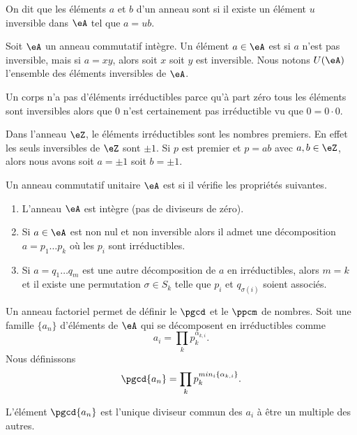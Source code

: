 \begin{definition}  \label{DefrXUixs}
    On dit que les éléments \( a\) et \( b\) d'un anneau sont  si il existe un élément \( u\) inversible dans \( \eA\) tel que \( a=ub\).
\end{definition}

\begin{definition}  \label{DeirredBDhQfA}
    Soit \( \eA\) un anneau commutatif intègre. Un élément \( a\in\eA\) est  si \( a\) n'est pas inversible, mais si \( a=xy\), alors soit \( x\) soit \( y\) est inversible. Nous notons \( U(\eA)\) l'ensemble des éléments inversibles de \( \eA\).
\end{definition}

\begin{remark}
    Un corps n'a pas d'éléments irréductibles parce qu'à part zéro tous les éléments sont inversibles alors que \( 0\) n'est certainement pas irréductible vu que \( 0=0\cdot 0\).
\end{remark}

\begin{example}
    Dans l'anneau \( \eZ\), le éléments irréductibles sont les nombres premiers. En effet les seuls inversibles de \( \eZ\) sont \( \pm 1\). Si \( p\) est premier et \( p=ab\) avec \( a,b\in \eZ\), alors nous avons soit \( a=\pm 1\) soit \( b=\pm 1\).
\end{example}

\begin{definition}
    Un anneau commutatif unitaire \( \eA\) est  si il vérifie les propriétés suivantes.
    \begin{enumerate}
        \item
            L'anneau \( \eA\) est intègre (pas de diviseurs de zéro).
        \item
            Si \( a\in \eA\) est non nul et non inversible alors il admet une décomposition \( a=p_1\ldots p_k\) où les \( p_i\) sont irréductibles.
        \item
            Si \( a=q_1\ldots q_m\) est une autre décomposition de \( a\) en irréductibles, alors \( m=k\) et il existe une permutation \( \sigma\in S_k\) telle que \( p_i\) et \( q_{\sigma(i)}\) soient associés.
    \end{enumerate}
\end{definition}

Un anneau factoriel permet de définir le \( \pgcd\) et le \( \ppcm\) de nombres. Soit une famille \( \{ a_n \}\) d'éléments de \( \eA\) qui se décomposent en irréductibles comme
\begin{equation}
    a_i=\prod_{k}p_k^{\alpha_{k,i}}.
\end{equation}
Nous définissons
\begin{equation}
    \pgcd\{ a_n \}=\prod_kp_k^{min_i\{ \alpha_{k,i} \}}.
\end{equation}
\begin{proposition}
    L'élément \( \pgcd\{ a_n \}\) est l'unique diviseur commun des \( a_i\) à être un multiple des autres.
\end{proposition}

